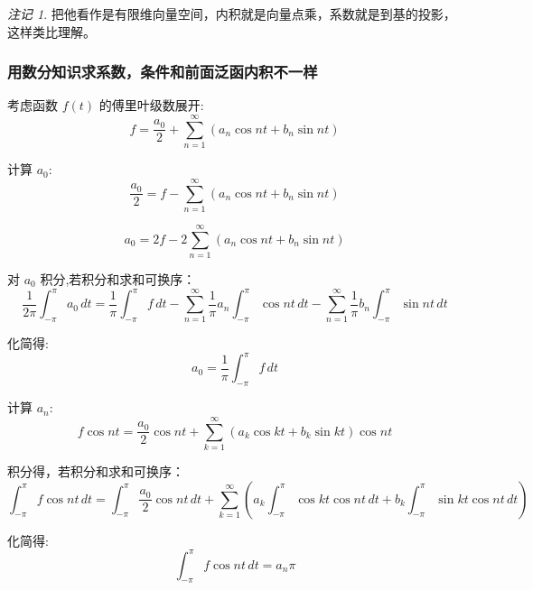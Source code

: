 \documentclass[12pt,a4paper]{article}
\numberwithin{subsection}{section}   %
\numberwithin{subsubsection}{subsection}
\theoremstyle{plain}
\theoremstyle{definition}
\theoremstyle{remark}
\newtheorem{remark}[theorem]{注记}
\theoremstyle{remark}
\begin{document}
\begin{remark}
把他看作是有限维向量空间，内积就是向量点乘，系数就是到基的投影，这样类比理解。
\end{remark}


	\subsubsection{用数分知识求系数，条件和前面泛函内积不一样}

考虑函数 \( f(t) \) 的傅里叶级数展开:
\begin{equation}
	f = \frac{a_0}{2} + \sum_{n=1}^{\infty} \left( a_n \cos nt + b_n \sin nt \right)
\end{equation}

计算 \( a_0 \):
\begin{equation}
	\frac{a_0}{2} = f - \sum_{n=1}^{\infty} \left( a_n \cos nt + b_n \sin nt \right)
\end{equation}

\begin{equation}
	a_0 = 2f - 2 \sum_{n=1}^{\infty} \left( a_n \cos nt + b_n \sin nt \right)
\end{equation}

对 \( a_0 \) 积分,若积分和求和可换序：
\begin{equation}
	\frac{1}{2\pi} \int_{-\pi}^{\pi} a_0 \, dt = \frac{1}{\pi} \int_{-\pi}^{\pi} f \, dt - \sum_{n=1}^{\infty} \frac{1}{\pi} a_n \int_{-\pi}^{\pi} \cos nt \, dt - \sum_{n=1}^{\infty} \frac{1}{\pi} b_n \int_{-\pi}^{\pi} \sin nt \, dt
\end{equation}

化简得:
\begin{equation}
	a_0 = \frac{1}{\pi} \int_{-\pi}^{\pi} f \, dt
\end{equation}

计算 \( a_n \):
\begin{equation}
	f \cos nt = \frac{a_0}{2} \cos nt + \sum_{k=1}^{\infty} \left( a_k \cos kt + b_k \sin kt \right) \cos nt
\end{equation}

积分得，若积分和求和可换序：
\begin{equation}
	\int_{-\pi}^{\pi} f \cos nt \, dt = \int_{-\pi}^{\pi} \frac{a_0}{2} \cos nt \, dt + \sum_{k=1}^{\infty} \left( a_k \int_{-\pi}^{\pi} \cos kt \cos nt \, dt + b_k \int_{-\pi}^{\pi} \sin kt \cos nt \, dt \right)
\end{equation}

化简得:
\begin{equation}
	\int_{-\pi}^{\pi} f \cos nt \, dt = a_n \pi
\end{equation}
\end{document}
